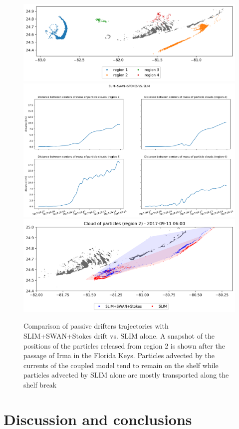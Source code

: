 \documentclass[11pt,a4paper]{article}
\begin{document}
\begin{figure}
    \centering
    \includegraphics[width=.75\textwidth]{fig/release_regions.png}
    \includegraphics[width=.95\textwidth]{fig/slim+swan+stokes_vs_slim_WW3.png}
    \includegraphics[width=.75\textwidth]{fig/matthieu_ww3.png}
    \caption{Comparison of passive drifters trajectories with SLIM+SWAN+Stokes drift vs. SLIM alone. A snapshot of the positions of the particles released from region 2 is shown after the passage of Irma in the Florida Keys. Particles advected by the currents of the coupled model tend to remain on the shelf while particles advected by SLIM alone are mostly transported along the shelf break}
    \label{fig:traj}
\end{figure}

\section{Discussion and conclusions}
\end{document}
